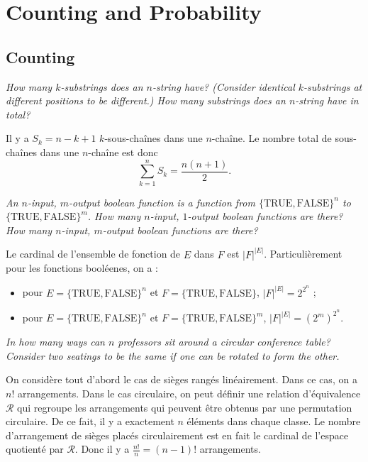 \section{Counting and Probability}

\subsection{Counting}

\begin{description}
   {\itshape How many $k$-substrings does an $n$-string have? (Consider identical $k$-substrings at different positions to be different.) How many substrings does an $n$-string have in total?}
    \begin{ex}
      Il y a $S_k = n - k + 1$ $k$-sous-cha\^ines dans une $n$-cha\^ine. Le nombre total de sous-cha\^ines dans une $n$-cha\^ine est donc \[\sum_{k=1}^n S_k = \frac{n(n+1)}{2}.\]
    \end{ex}
   {\itshape An $n$-input, $m$-output boolean function is a function from  $\{\textrm{TRUE}, \textrm{FALSE}\}^n$ to $\{\textrm{TRUE}, \textrm{FALSE}\}^m$. How many $n$-input, $1$-output boolean functions are there? How many $n$-input, $m$-output boolean functions are there?}
    \begin{ex}
      Le cardinal de l'ensemble de fonction de $E$ dans $F$  est $|F|^{|E|}$. Particuli\`erement pour les fonctions bool\'eenes, on a :
      \begin{itemize}
        \item pour $E = \{\textrm{TRUE}, \textrm{FALSE}\}^n$ et $F=\{\textrm{TRUE}, \textrm{FALSE}\}$, $|F|^{|E|} = 2^{2^n}$ ;
        \item pour $E = \{\textrm{TRUE}, \textrm{FALSE}\}^n$ et $F=\{\textrm{TRUE}, \textrm{FALSE}\}^m$, $|F|^{|E|} = {(2^m)}^{2^n}$.
      \end{itemize}
    \end{ex}
   {\itshape In how many ways can $n$ professors sit around a circular conference table? Consider two seatings to be the same if one can be rotated to form the other.}

    \begin{ex}
      On consid\`ere tout d'abord le cas de si\`eges rang\'es lin\'eairement. Dans ce cas, on a $n!$ arrangements. Dans le cas circulaire, on peut d\'efinir une relation d'\'equivalence $\mathcal{R}$ qui regroupe les arrangements qui peuvent \^etre obtenus par une permutation circulaire. De ce fait, il y a exactement $n$ \'el\'ements dans chaque classe. Le nombre d'arrangement de si\`eges plac\'es circulairement est en fait le cardinal de l'espace quotient\'e par $\mathcal{R}$. Donc il y a $\frac{n!}{n} = (n-1)!$ arrangements.
    \end{ex}


\end{description}
